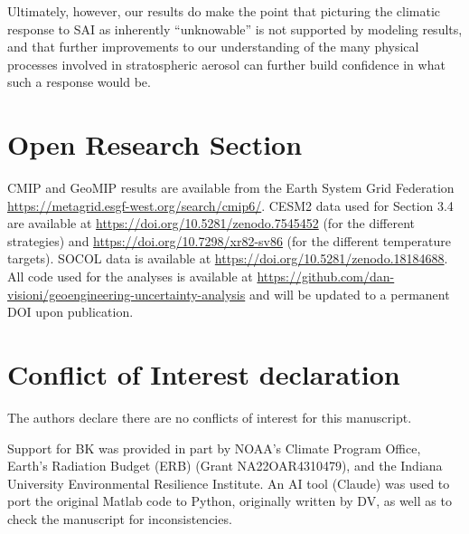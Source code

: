 \documentclass[draft]{agujournal2019}
\begin{document}
Ultimately, however, our results do make the point that picturing the climatic response to SAI as inherently ``unknowable'' is not supported by modeling results, and that further improvements to our understanding of the many physical processes involved in stratospheric aerosol can further build confidence in what such a response would be.






\section*{Open Research Section}
CMIP and GeoMIP results are available from the Earth System Grid Federation \url{https://metagrid.esgf-west.org/search/cmip6/}. CESM2 data used for Section 3.4 are available at \url{https://doi.org/10.5281/zenodo.7545452} (for the different strategies) and \url{https://doi.org/10.7298/xr82-sv86} (for the different temperature targets). SOCOL data is available at \url{https://doi.org/10.5281/zenodo.18184688}. All code used for the analyses is available at \url{https://github.com/dan-visioni/geoengineering-uncertainty-analysis} and will be updated to a permanent DOI upon publication.

\section*{Conflict of Interest declaration}
The authors declare there are no conflicts of interest for this manuscript.

\acknowledgments
Support for BK was provided in part by NOAA's Climate Program Office, Earth's Radiation Budget (ERB) (Grant NA22OAR4310479), and the Indiana University Environmental Resilience Institute. An AI tool (Claude) was used to port the original Matlab code to Python, originally written by DV, as well as to check the manuscript for inconsistencies.



\end{document}
